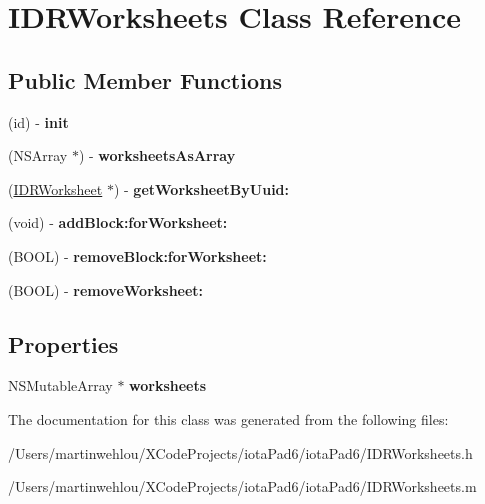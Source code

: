 \hypertarget{interface_i_d_r_worksheets}{
\section{IDRWorksheets Class Reference}
\label{interface_i_d_r_worksheets}
}
\subsection*{Public Member Functions}
\begin{DoxyCompactItemize}
\item 
\hypertarget{interface_i_d_r_worksheets_abcdf745a0cd7b701931ccc1a1d1267c0}{
(id) -\/ {\bfseries init}}
\label{interface_i_d_r_worksheets_abcdf745a0cd7b701931ccc1a1d1267c0}

\item 
\hypertarget{interface_i_d_r_worksheets_afd96760719da836f8f19e811f00f3f1e}{
(NSArray $\ast$) -\/ {\bfseries worksheetsAsArray}}
\label{interface_i_d_r_worksheets_afd96760719da836f8f19e811f00f3f1e}

\item 
\hypertarget{interface_i_d_r_worksheets_a8f442263b366c75f5a7517034a4d6d1f}{
(\hyperlink{interface_i_d_r_worksheet}{IDRWorksheet} $\ast$) -\/ {\bfseries getWorksheetByUuid:}}
\label{interface_i_d_r_worksheets_a8f442263b366c75f5a7517034a4d6d1f}

\item 
\hypertarget{interface_i_d_r_worksheets_a67311b277939abadd83a284f1d18788b}{
(void) -\/ {\bfseries addBlock:forWorksheet:}}
\label{interface_i_d_r_worksheets_a67311b277939abadd83a284f1d18788b}

\item 
\hypertarget{interface_i_d_r_worksheets_a80cf1488a6a737778d9dd9143e6009a5}{
(BOOL) -\/ {\bfseries removeBlock:forWorksheet:}}
\label{interface_i_d_r_worksheets_a80cf1488a6a737778d9dd9143e6009a5}

\item 
\hypertarget{interface_i_d_r_worksheets_ab0b301b6fb15129d59dea247832b718b}{
(BOOL) -\/ {\bfseries removeWorksheet:}}
\label{interface_i_d_r_worksheets_ab0b301b6fb15129d59dea247832b718b}

\end{DoxyCompactItemize}
\subsection*{Properties}
\begin{DoxyCompactItemize}
\item 
\hypertarget{interface_i_d_r_worksheets_aa3f49ce1c3bb86e5b413b8735c931a70}{
NSMutableArray $\ast$ {\bfseries worksheets}}
\label{interface_i_d_r_worksheets_aa3f49ce1c3bb86e5b413b8735c931a70}

\end{DoxyCompactItemize}


The documentation for this class was generated from the following files:\begin{DoxyCompactItemize}
\item 
/Users/martinwehlou/XCodeProjects/iotaPad6/iotaPad6/IDRWorksheets.h\item 
/Users/martinwehlou/XCodeProjects/iotaPad6/iotaPad6/IDRWorksheets.m\end{DoxyCompactItemize}
